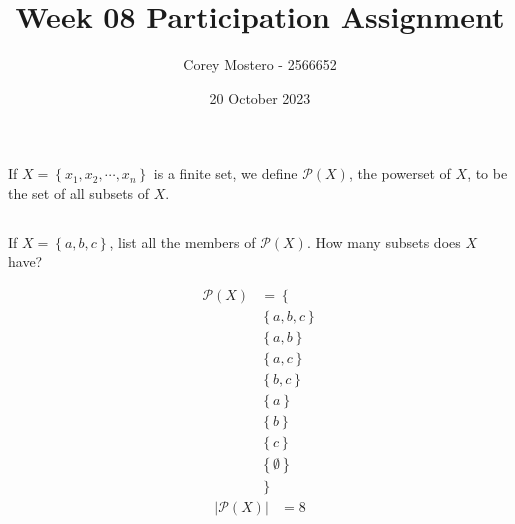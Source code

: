 \documentclass{article}
\title{Week 08 Participation Assignment}
\author{Corey Mostero - 2566652}
\date{20 October 2023}
\begin{document}
\newcommand{\hr}{\par\noindent\rule{\textwidth}{0.4pt}}

\newcommand{\bc}[1]{
	\begin{equation*}
		\begin{boxed}
			{#1}
		\end{boxed}
	\end{equation*}
}

\newcommand{\cond}[2]{
	\ifmmode
	{#1} \quad {#2}
	\else
	$$ {#1} \quad {#2} $$
	\fi
}

\newcommand{\matr}[1]{
	\ifmmode \bm{#1}
	\else \textit{\textbf{#1}}
	\fi
}
\newcommand{\vect}[1]{
	\ifmmode \mathbf{#1}
	\else \textbf{#1}
	\fi
}


\maketitle
\newpage

\section{}

If $ X = \left\{ x_1, x_2, \cdots, x_n \right\} $ is a finite set, we define $ \mathcal{P}(X) $, the powerset of $ X $, to be the set of all subsets of $ X $.

\subsection{} \label{a}

If $ X = \left\{ a, b, c \right\} $, list all the members of $ \mathcal{P}(X) $. How many subsets does $ X $ have?

\begin{align*}
	\mathcal{P}(X) & = \left\{ \right.          \\
	               & \left\{ a, b, c \right\}   \\
	               & \left\{ a, b \right\}      \\
	               & \left\{ a, c \right\}      \\
	               & \left\{ b, c \right\}      \\
	               & \left\{ a \right\}         \\
	               & \left\{ b \right\}         \\
	               & \left\{ c \right\}         \\
	               & \left\{ \emptyset \right\} \\
	               & \left. \right\}
\end{align*}
\begin{align*}
	\left| \mathcal{P}(X) \right| & = 8
\end{align*}
\end{document}
